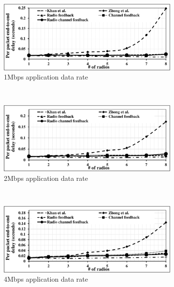 \begin{landscape}
\begin{figure}[!htbp]
    \centering
    \begin{subfigure}[t]{0.625\textwidth}
        \includegraphics[width=\textwidth]{alltopology/12Delay24d1}
        \caption{1Mbps application data rate}
    \end{subfigure}
    ~
    \begin{subfigure}[t]{0.625\textwidth}
        \includegraphics[width=\textwidth]{alltopology/12Delay24d2}
        \caption{2Mbps application data rate}
    \end{subfigure}
    ~\\
    \begin{subfigure}[t]{0.625\textwidth}
        \includegraphics[width=\textwidth]{alltopology/12Delay24d4}
        \caption{4Mbps application data rate}
    \end{subfigure}
    ~
    \begin{subfigure}[t]{0.625\textwidth}

\end{subfigure}
\end{figure}
\end{landscape}
